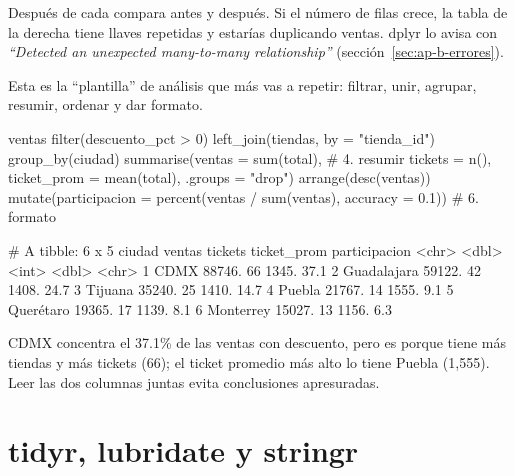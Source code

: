 \begin{advertencia}
Después de cada  compara  antes y
después. Si el número de filas crece, la tabla de la derecha tiene llaves
repetidas y estarías duplicando ventas. dplyr lo avisa con
\emph{``Detected an unexpected many-to-many relationship''}
(sección~\ref{sec:ap-b-errores}).
\end{advertencia}

Esta es la ``plantilla'' de análisis que más vas a repetir: filtrar, unir,
agrupar, resumir, ordenar y dar formato.

\begin{rcode}[title={Plantilla: ventas con descuento por ciudad}]
ventas %
  filter(descuento_pct > 0) %
  left_join(tiendas, by = "tienda_id") %
  group_by(ciudad) %
  summarise(ventas = sum(total),                # 4. resumir
            tickets = n(),
            ticket_prom = mean(total),
            .groups = "drop") %
  arrange(desc(ventas)) %
  mutate(participacion = percent(ventas / sum(ventas),
                                 accuracy = 0.1)) # 6. formato
\end{rcode}
\begin{rsalida}
# A tibble: 6 x 5
  ciudad      ventas tickets ticket_prom participacion
  <chr>        <dbl>   <int>       <dbl> <chr>
1 CDMX        88746.      66       1345. 37.1%
2 Guadalajara 59122.      42       1408. 24.7%
3 Tijuana     35240.      25       1410. 14.7%
4 Puebla      21767.      14       1555. 9.1%
5 Querétaro   19365.      17       1139. 8.1%
6 Monterrey   15027.      13       1156. 6.3%
\end{rsalida}

CDMX concentra el 37.1\% de las ventas con descuento, pero es porque tiene
más tiendas y más tickets (66); el ticket promedio más alto lo tiene
Puebla (1,555). Leer las dos columnas juntas evita conclusiones apresuradas.

\section{tidyr, lubridate y stringr}
\label{sec:ap-b-tidyr}


